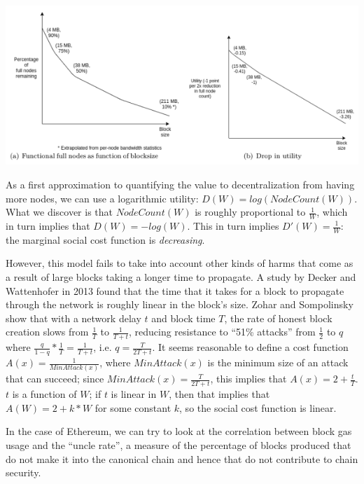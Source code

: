 \documentclass[12pt, final]{article}
\begin{document}
	\includegraphics[width=5.5in]{blocksize_fullnodes.png}


As a first approximation to quantifying the value to decentralization from having more nodes, we can use a logarithmic utility: $D(W) = log(NodeCount(W))$. What we discover is that $NodeCount(W)$ is roughly proportional to $\frac{1}{W}$, which in turn implies that $D(W) = -log(W)$. This in turn implies $D'(W) = \frac{1}{W}$: the marginal social cost function is \emph{decreasing}.

However, this model fails to take into account other kinds of harms that come as a result of large blocks taking a longer time to propagate. A study by Decker and Wattenhofer in 2013 found that the time that it takes for a block to propagate through the network is roughly linear in the block's size. Zohar and Sompolinsky\cite{GHOST} show that with a network delay $t$ and block time $T$, the rate of honest block creation slows from $\frac{1}{T}$ to $\frac{1}{T+t}$, reducing resistance to ``51\% attacks'' from $\frac{1}{2}$ to $q$ where $\frac{q}{1-q} * \frac{1}{T} = \frac{1}{T+t}$, i.e. $q = \frac{T}{2T + t}$. It seems reasonable to define a cost function $A(x) = \frac{1}{MinAttack(x)}$, where $MinAttack(x)$ is the minimum size of an attack that can succeed; since $MinAttack(x) = \frac{T}{2T + t}$, this implies that $A(x) = 2 + \frac{t}{T}$. $t$ is a function of $W$; if $t$ is linear in $W$, then that implies that $A(W) = 2 + k * W$ for some constant $k$, so the social cost function is linear.

In the case of Ethereum, we can try to look at the correlation between block gas usage and the ``uncle rate'', a measure of the percentage of blocks produced that do not make it into the canonical chain and hence that do not contribute to chain security.
\end{document}
